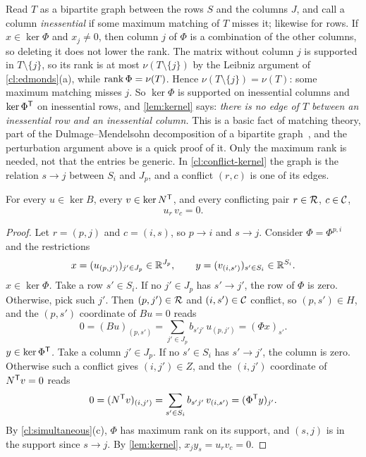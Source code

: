 \begin{remark}\label{rem:DM}
Read $T$ as a bipartite graph between the rows $S$ and the columns $J$, and
call a column \emph{inessential} if some maximum matching of $T$ misses it;
likewise for rows. If $x\in\ker\Phi$ and $x_j\ne0$, then column $j$ of
$\Phi$ is a combination of the other columns, so deleting it does not lower
the rank. The matrix without column $j$ is supported in $T\setminus\{j\}$,
so its rank is at most $\nu(T\setminus\{j\})$ by the Leibniz argument of
\cref{cl:edmonds}(a), while $\operatorname{rank}\Phi=\nu(T)$. Hence
$\nu(T\setminus\{j\})=\nu(T)$: some maximum matching misses $j$. So
$\ker\Phi$ is supported on inessential columns and $\ker\Phi^\mathsf T$ on
inessential rows, and \cref{lem:kernel} says: \emph{there is no edge of
$T$ between an inessential row and an inessential column.} This is a
basic fact of matching theory, part of the Dulmage--Mendelsohn
decomposition of a bipartite graph~\cite{DulmageMendelsohn1958,LovaszPlummer1986},
and the perturbation argument above is a quick proof of it. Only the
maximum rank is needed, not that the entries be generic. In
\cref{cl:conflict-kernel} the graph is the relation $s\to j$ between
$S_i$ and $J_p$, and a conflict $(r,c)$ is one of its edges.
\end{remark}

\begin{claim}\label{cl:conflict-kernel}
For every $u\in\ker B$, every $v\in\ker N^\mathsf T$, and every conflicting pair
$r\in\mathcal R$, $c\in\mathcal C$,
\[
 u_r\,v_c=0 .
\]
\end{claim}

\begin{proof}
Let $r=(p,j)$ and $c=(i,s)$, so $p\to i$ and $s\to j$. Consider
$\Phi=\Phi^{p,i}$ and the restrictions
\[
 x=(u_{(p,j')})_{j'\in J_p}\in\mathbb R^{J_p},\qquad y=(v_{(i,s')})_{s'\in S_i}\in\mathbb R^{S_i}.
\]
\emph{$x\in\ker\Phi$.} Take a row $s'\in S_i$. If no $j'\in J_p$ has $s'\to j'$, the
row of $\Phi$ is zero. Otherwise, pick such $j'$. Then $(p,j')\in\mathcal R$ and
$(i,s')\in\mathcal C$ conflict, so $(p,s')\in H$, and the $(p,s')$ coordinate of
$Bu=0$ reads
\[
 0=(Bu)_{(p,s')}=\sum_{j'\in J_p}b_{s'j'}\,u_{(p,j')}=(\Phi x)_{s'}.
\]
\emph{$y\in\ker\Phi^\mathsf T$.} Take a column $j'\in J_p$. If no $s'\in S_i$ has $s'\to j'$,
the column is zero. Otherwise such a conflict gives $(i,j')\in Z$, and the
$(i,j')$ coordinate of $N^\mathsf T v=0$ reads
\[
 0=(N^\mathsf T v)_{(i,j')}=\sum_{s'\in S_i}b_{s'j'}\,v_{(i,s')}=(\Phi^\mathsf T y)_{j'}.
\]
By \cref{cl:simultaneous}(c), $\Phi$ has maximum rank on its support, and
$(s,j)$ is in the support since $s\to j$. By \cref{lem:kernel},
$x_jy_s=u_rv_c=0$.
\end{proof}

